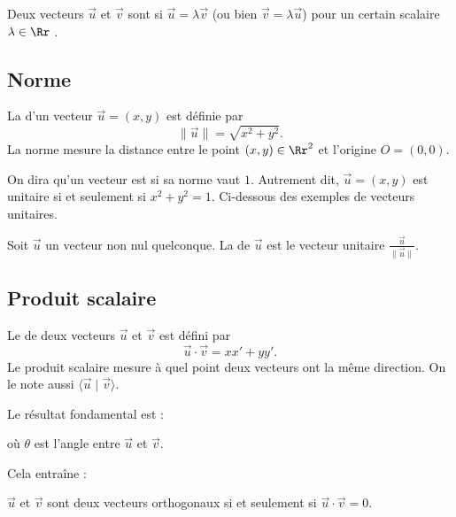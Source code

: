 \documentclass[11pt,class=report,crop=false]{standalone}
\begin{document}
Deux vecteurs $\vec u$ et $\vec v$ sont  si $\vec u = \lambda \vec v$ (ou bien $\vec v = \lambda \vec u$) pour un certain scalaire $\lambda \in \Rr$ .



\subsection{Norme}

La  d'un vecteur $\vec u=(x,y)$ est définie par
$$
    \|\vec u\| = \sqrt{x^2 + y^2}.
$$
La norme mesure la distance entre le point $(x,y)\in\Rr^2$ et l'origine $O=(0,0)$.



On dira qu'un vecteur est  si sa norme vaut $1$. Autrement dit, $\vec u = (x,y)$ est unitaire si et seulement si $x^2 + y^2 = 1$.
Ci-dessous des exemples de vecteurs unitaires.

Soit $\vec u$ un vecteur non nul quelconque. La  de $\vec u$ est le vecteur unitaire $\frac{\vec u}{\|\vec u\|}$.   



\subsection{Produit scalaire}


Le  de deux vecteurs $\vec u$ et $\vec v$ est défini par
$$
    \vec u \cdot \vec v = x x' + y y'.
$$
Le produit scalaire mesure à quel point deux vecteurs ont la même direction.
On le note aussi $\langle \vec u \mid \vec v \rangle$.

Le résultat fondamental est : 
\begin{proposition}
    \sauteligne
    où $\theta$ est l'angle entre $\vec u$ et $\vec v$.
\end{proposition}


Cela entraîne :
\begin{proposition}
  $\vec u$ et $\vec v$ sont deux vecteurs orthogonaux si et seulement si $\vec u \cdot \vec v = 0$.
\end{proposition}
\end{document}

